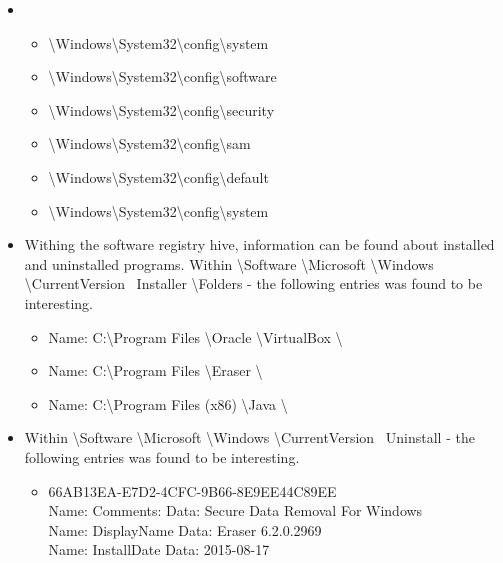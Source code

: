 \begin{enumerate}
\begin{itemize}
	\item 
	\begin{itemize}
		\item \textbackslash Windows\textbackslash System32\textbackslash config\textbackslash system\\ 
		\item \textbackslash Windows\textbackslash System32\textbackslash config\textbackslash software\\
		\item \textbackslash Windows\textbackslash System32\textbackslash config\textbackslash security\\
		\item \textbackslash Windows\textbackslash System32\textbackslash config\textbackslash sam \\
		\item \textbackslash Windows\textbackslash System32\textbackslash config\textbackslash default \\
		\item \textbackslash Windows\textbackslash System32\textbackslash config\textbackslash system \\
	\end{itemize} 
	
	\item Withing the software registry hive, information can be found about installed and uninstalled programs. Within \textbackslash Software \textbackslash Microsoft \textbackslash Windows \textbackslash CurrentVersion \ Installer \textbackslash Folders - the following entries was found to be interesting.
	
	\begin{itemize} 
		\item Name: C:\textbackslash Program Files \textbackslash Oracle \textbackslash VirtualBox \textbackslash
		\item Name: C:\textbackslash Program Files \textbackslash Eraser \textbackslash
		\item Name: C:\textbackslash Program Files (x86) \textbackslash Java \textbackslash\\
	\end{itemize}
	
	\item  Within \textbackslash Software \textbackslash Microsoft \textbackslash Windows \textbackslash CurrentVersion \ Uninstall - the following entries was found to be interesting.
	
	\begin{itemize}
		\item \textbraceleft 66AB13EA-E7D2-4CFC-9B66-8E9EE44C89EE \textbraceright \\
		Name: Comments: Data: Secure Data Removal For Windows \\
		Name: DisplayName Data: Eraser 6.2.0.2969 \\
		Name: InstallDate Data: 2015-08-17 \\
		

\end{itemize}
\end{itemize}
\end{enumerate}
